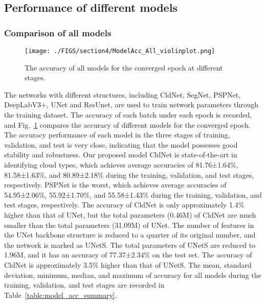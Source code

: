 \documentclass[review]{elsarticle}
\begin{document}
\subsection{Performance of different models} %
\label{section:models_performance}
\subsubsection{Comparison of all models} %
\label{section:models_comparison}

\begin{figure}[!htp]
    \vspace{5mm}
    \centering
    \texttt{[image: ./FIGS/section4/ModelAcc\_All\_violinplot.png]}
    \caption{The accuracy of all models for the converged epoch at different stages.}
    \label{fig:ModelAcc_All_violinplot}
\end{figure}

The networks with different structures, including CldNet, SegNet, PSPNet, DeepLabV3+, UNet and ResUnet, are used to train network parameters through the training dataset.
The accuracy of each batch under each epoch is recorded, and Fig.~\ref{fig:ModelAcc_All_violinplot} compares the accuracy of different models for the converged epoch.
The accuracy performance of each model in the three stages of training, validation, and test is very close, indicating that the model possesses good stability and robustness.
Our proposed model CldNet is state-of-the-art in identifying cloud types, which achieves average accuracies of 81.76±1.64\%, 81.58±1.63\%, and 80.89±2.18\% during the training, validation, and test stages, respectively.
PSPNet is the worst, which achieves average accuracies of 54.95±2.06\%, 55.92±1.70\%, and 55.58±1.43\% during the training, validation, and test stages, respectively.
The accuracy of CldNet is only approximately 1.4\% higher than that of UNet, but the total parameters (0.46M) of CldNet are much smaller than the total parameters (31.09M) of UNet.
The number of features in the UNet backbone structure is reduced to a quarter of its original number, and the network is marked as UNetS.
The total parameters of UNetS are reduced to 1.96M, and it has an accuracy of 77.37±2.34\% on the test set.
The accuracy of CldNet is approximately 3.5\% higher than that of UNetS.
The mean, standard deviation, minimum, median, and maximum of accuracy for all models during the training, validation, and test stages are recorded in Table~\ref{table:model_acc_summary}.
\end{document}
